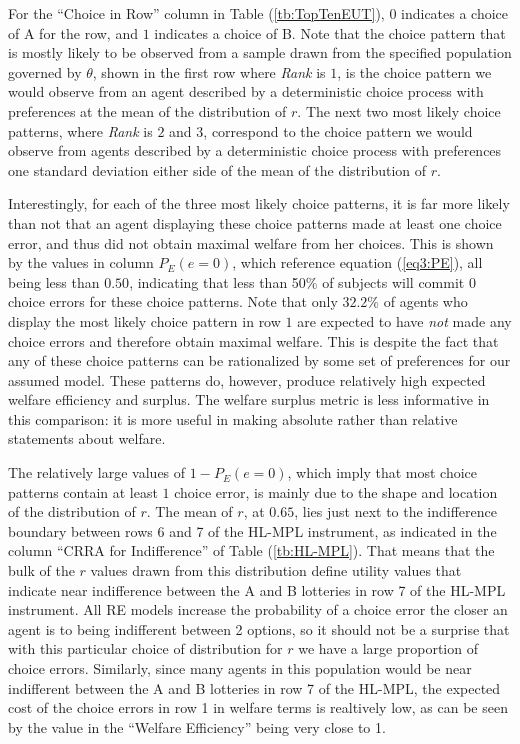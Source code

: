 \documentclass[../main.tex]{subfiles}
\begin{document}
For the \enquote{Choice in Row} column in Table (\ref{tb:TopTenEUT}), $0$ indicates a choice of A for the row, and $1$ indicates a choice of B.
Note that the choice pattern that is mostly likely to be observed from a sample drawn from the specified population governed by $\theta$, shown in the first row where \textit{Rank} is $1$, is the choice pattern we would observe from an agent described by a deterministic choice process with preferences at the mean of the distribution of $r$.
The next two most likely choice patterns, where \textit{Rank} is $2$ and $3$, correspond to the choice pattern we would observe from agents described by a deterministic choice process with preferences one standard deviation either side of the mean of the distribution of $r$.

Interestingly, for each of the three most likely choice patterns, it is far more likely than not that an agent displaying these choice patterns made at least one choice error, and thus did not obtain maximal welfare from her choices.
This is shown by the values in column $P_E(e=0)$, which reference equation (\ref{eq3:PE}), all being less than $0.50$, indicating that less than 50\% of subjects will commit 0 choice errors for these choice patterns.
Note that only $32.2\%$ of agents who display the most likely choice pattern in row $1$ are expected to have \textit{not} made any choice errors and therefore obtain maximal welfare.
This is despite the fact that any of these choice patterns can be rationalized by some set of preferences for our assumed model.
These patterns do, however, produce relatively high expected welfare efficiency and surplus.
The welfare surplus metric is less informative in this comparison: it is more useful in making absolute rather than relative statements about welfare.

The relatively large values of $ 1 - P_E(e = 0)$, which imply that most choice patterns contain at least $1$ choice error, is mainly due to the shape and location of the distribution of $r$.
The mean of $r$, at $0.65$, lies just next to the indifference boundary between rows 6 and 7 of the HL-MPL instrument, as indicated in the column \enquote{CRRA for Indifference} of Table (\ref{tb:HL-MPL}).
That means that the bulk of the $r$ values drawn from this distribution define utility values that indicate near indifference between the A and B lotteries in row 7 of the HL-MPL instrument.
All RE models increase the probability of a choice error the closer an agent is to being indifferent between 2 options, so it should not be a surprise that with this particular choice of distribution for $r$ we have a large proportion of choice errors.
Similarly, since many agents in this population would be near indifferent between the A and B lotteries in row 7 of the HL-MPL, the expected cost of the choice errors in row 1 in welfare terms is realtively low, as can be seen by the value in the \enquote{Welfare Efficiency} being very close to 1.
\end{document}
